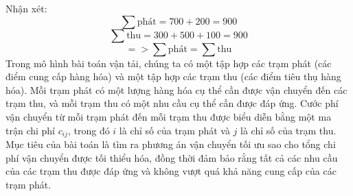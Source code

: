 Nhận xét: \\
$$\sum \text{phát} = 700 + 200 = 900$$
$$\sum \text{thu} = 300 + 500 + 100 = 900$$
$$=> \sum \text{phát} = \sum \text{thu}$$
Trong mô hình bài toán vận tải, chúng ta có một tập hợp các trạm phát (các điểm cung cấp hàng hóa) và một tập hợp các trạm thu (các điểm tiêu thụ hàng hóa). Mỗi trạm phát có một lượng hàng hóa cụ thể cần được vận chuyển đến các trạm thu, và mỗi trạm thu có một nhu cầu cụ thể cần được đáp ứng. Cước phí vận chuyển từ mỗi trạm phát đến mỗi trạm thu được biểu diễn bằng một ma trận chi phí $c_{ij}$, trong đó $i$ là chỉ số của trạm phát và $j$ là chỉ số của trạm thu. Mục tiêu của bài toán là tìm ra phương án vận chuyển tối ưu sao cho tổng chi phí vận chuyển được tối thiểu hóa, đồng thời đảm bảo rằng tất cả các nhu cầu của các trạm thu được đáp ứng và không vượt quá khả năng cung cấp của các trạm phát.